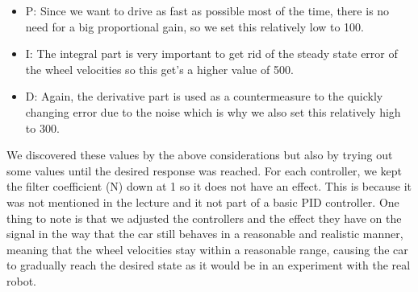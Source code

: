 \documentclass[12pt]{article}
\begin{document}
\begin{enumerate}[a)]
\begin{itemize}
\item P: Since we want to drive as fast as possible most of the time, there is no need for a big proportional gain, so we set this relatively low to 100.
\item I: The integral part is very important to get rid of the steady state error of the wheel velocities so this get's a higher value of 500.
\item D: Again, the derivative part is used as a countermeasure to the quickly changing error due to the noise which is why we also set this relatively high to 300.
\end{itemize}
We discovered these values by the above considerations but also by trying out some values until the desired response was reached. For each controller, we kept the filter coefficient (N) down at 1 so it does not have an effect. This is because it was not mentioned in the lecture and it not part of a basic PID controller. One thing to note is that we adjusted the controllers and the effect they have on the signal in the way that the car still behaves in a reasonable and realistic manner, meaning that the wheel velocities stay within a reasonable range, causing the car to gradually reach the desired state as it would be in an experiment with the real robot.
\end{enumerate}
\end{document}
